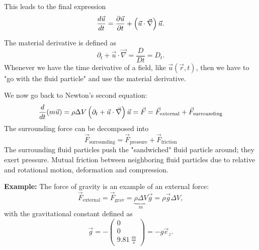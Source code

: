 This leads to the final expression
\begin{equation}
\frac{d \vec{u}}{d t} = \frac{\partial \vec{u}}{\partial t} + \left(\vec{u}\cdot\vec{\nabla}\right)\vec{u}.
\end{equation}
\begin{framed}
The material derivative is defined as
\begin{equation}
\partial_t+\vec{u}\cdot\vec{\nabla}=\frac{D}{Dt}=D_t.
\end{equation}
Whenever we have the time derivative of a field, like $\vec{u}(\vec{r},t)$, then we have to "go with the fluid particle" and use the material derivative.
\end{framed}
We now go back to Newton's second equation:
\begin{equation}
\frac{d }{d t}(m\vec{u}) = \rho\Delta V\left(\partial_t + \vec{u}\cdot\vec{\nabla}\right)\vec{u} = \vec{F} = \vec{F}_\mathrm{external} + \vec{F}_\mathrm{surrounding}
\end{equation}
The surrounding force can be decomposed into
\begin{equation}
\vec{F}_\mathrm{surrounding} = \vec{F}_\mathrm{pressure} + \vec{F}_\mathrm{friction}
\end{equation}
The surrounding fluid particles push the "sandwiched" fluid particle around; they exert pressure. Mutual friction between neighboring fluid particles due to relative and rotational motion, deformation and compression.

\begin{framed}
\textbf{Example:} The force of gravity is an example of an external force:
\begin{equation}
\vec{F}_\text{external} = \vec{F}_\text{grav} = \underbrace{\rho\Delta V}_m\vec{g}=\rho\vec{g}\Delta V,
\end{equation}
with the gravitational constant defined as
\begin{equation}
\vec{g} = -\begin{pmatrix}
0\\0\\\SI{9.81}{\frac{m}{s}}
\end{pmatrix} = -g\vec{e}_z.
\end{equation}
\end{framed}


